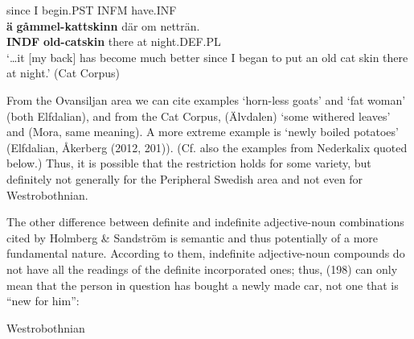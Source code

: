 since  I  begin.PST  INFM  have.INF\\

 \ea\label{}
\gll \textbf{ä}\textbf{  gåmmel-kattskinn} där  om  netträn.\\


\textbf{INDF} \textbf{old-catskin} there  at   night.DEF.PL\\

\glt ‘…it [my back] has become much better since I began to put an old cat skin there at night.’ (Cat Corpus) 

\z

From the Ovansiljan area we can cite \citet[52]{Levander1909} examples  ‘horn-less goats’ and  ‘fat woman’ (both Elfdalian), and from the Cat Corpus,  (Älvdalen) ‘some withered leaves’ and (Mora, same meaning). A more extreme example is \textbf{ }‘newly boiled potatoes’ (Elfdalian, Åkerberg (2012, 201)). (Cf. also the examples from Nederkalix quoted below.) Thus, it is possible that the restriction holds for some variety, but definitely not generally for the Peripheral Swedish area and not even for Westrobothnian. 


The other difference between definite and indefinite adjective-noun combinations cited by Holmberg \& Sandström is semantic and thus potentially of a more fundamental nature. According to them, indefinite adjective-noun compounds do not have all the readings of the definite incorporated ones; thus, (198) can only mean that the person in question has bought a newly made car, not one that is “new for him”:


\item 

\label{bkm:Ref154565993}Westrobothnian



